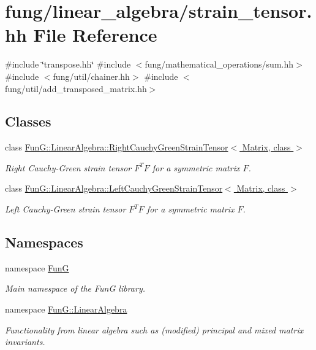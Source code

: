 \hypertarget{strain__tensor_8hh}{\section{fung/linear\-\_\-algebra/strain\-\_\-tensor.hh \-File \-Reference}
\label{strain__tensor_8hh}
}
{\ttfamily \#include \char`\"{}transpose.\-hh\char`\"{}}\*
{\ttfamily \#include $<$fung/mathematical\-\_\-operations/sum.\-hh$>$}\*
{\ttfamily \#include $<$fung/util/chainer.\-hh$>$}\*
{\ttfamily \#include $<$fung/util/add\-\_\-transposed\-\_\-matrix.\-hh$>$}\*
\subsection*{\-Classes}
\begin{DoxyCompactItemize}
\item 
class \hyperlink{classFunG_1_1LinearAlgebra_1_1RightCauchyGreenStrainTensor}{\-Fun\-G\-::\-Linear\-Algebra\-::\-Right\-Cauchy\-Green\-Strain\-Tensor$<$ Matrix, class $>$}
\begin{DoxyCompactList}\small\item\em \-Right \-Cauchy-\/\-Green strain tensor $ F^T F $ for a symmetric matrix $ F $. \end{DoxyCompactList}\item 
class \hyperlink{classFunG_1_1LinearAlgebra_1_1LeftCauchyGreenStrainTensor}{\-Fun\-G\-::\-Linear\-Algebra\-::\-Left\-Cauchy\-Green\-Strain\-Tensor$<$ Matrix, class $>$}
\begin{DoxyCompactList}\small\item\em \-Left \-Cauchy-\/\-Green strain tensor $ F^T F $ for a symmetric matrix $ F $. \end{DoxyCompactList}\end{DoxyCompactItemize}
\subsection*{\-Namespaces}
\begin{DoxyCompactItemize}
\item 
namespace \hyperlink{namespaceFunG}{\-Fun\-G}
\begin{DoxyCompactList}\small\item\em \-Main namespace of the \-Fun\-G library. \end{DoxyCompactList}\item 
namespace \hyperlink{namespaceFunG_1_1LinearAlgebra}{\-Fun\-G\-::\-Linear\-Algebra}
\begin{DoxyCompactList}\small\item\em \-Functionality from linear algebra such as (modified) principal and mixed matrix invariants. \end{DoxyCompactList}\end{DoxyCompactItemize}
